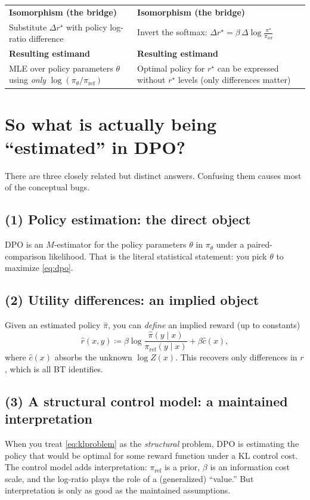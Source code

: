 \documentclass[11pt]{article}
\newcommand{\1}{\mathbf{1}}
\theoremstyle{plain}
\theoremstyle{definition}
\theoremstyle{remark}
\begin{document}
\begin{center}
\begin{tabularx}{\textwidth}{@{}Y Y@{}}
\midrule
\textbf{Isomorphism (the bridge)} &
\textbf{Isomorphism (the bridge)} \\
Substitute $\Delta r^\star$ with policy log-ratio difference &
Invert the softmax: $\Delta r^\star=\beta\,\Delta\log\frac{\pi^\star}{\pi_{\mathrm{ref}}}$ \\
\midrule
\textbf{Resulting estimand} &
\textbf{Resulting estimand} \\
MLE over policy parameters $\theta$ using \emph{only} $\log(\pi_\theta/\pi_{\mathrm{ref}})$ &
Optimal policy for $r^\star$ can be expressed without $r^\star$ levels (only differences matter) \\
\bottomrule
\end{tabularx}
\end{center}

\section{So what is actually being ``estimated'' in DPO?}
There are three closely related but distinct answers. Confusing them causes most of the conceptual bugs.

\subsection{(1) Policy estimation: the direct object}
DPO is an $M$-estimator for the policy parameters $\theta$ in $\pi_\theta$ under a paired-comparison likelihood.
That is the literal statistical statement: you pick $\theta$ to maximize \eqref{eq:dpo}.

\subsection{(2) Utility differences: an implied object}
Given an estimated policy $\hat\pi$, you can \emph{define} an implied reward (up to constants)
\[
\hat r(x,y)\coloneqq \beta\log\frac{\hat\pi(y\mid x)}{\pi_{\mathrm{ref}}(y\mid x)} + \beta \hat c(x),
\]
where $\hat c(x)$ absorbs the unknown $\log Z(x)$. This recovers only differences in $r$, which is all BT identifies.

\subsection{(3) A structural control model: a maintained interpretation}
When you treat \eqref{eq:klproblem} as the \emph{structural} problem, DPO is estimating the policy that would be optimal
for some reward function under a KL control cost. The control model adds interpretation: $\pi_{\mathrm{ref}}$ is a prior,
$\beta$ is an information cost scale, and the log-ratio plays the role of a (generalized) ``value.'' But interpretation is only
as good as the maintained assumptions.
\end{document}

